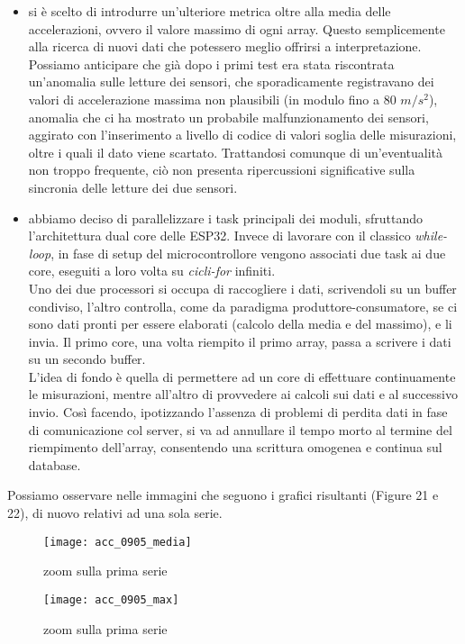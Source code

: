 \documentclass[fleqn,10pt]{SelfArx} %
\begin{document}
\begin{itemize}[noitemsep] %
	\item si è scelto di introdurre un'ulteriore metrica oltre alla media delle accelerazioni, ovvero il valore massimo di 
	ogni array. Questo semplicemente alla ricerca di nuovi dati che potessero meglio offrirsi a interpretazione.\\
	Possiamo anticipare che già dopo i primi test era stata riscontrata un'anomalia sulle letture dei sensori, che sporadicamente 
	registravano dei valori di accelerazione massima non plausibili (in modulo fino a 80 $ m/s^2 $), anomalia che ci ha mostrato 
	un probabile malfunzionamento dei sensori, aggirato con l'inserimento a livello di codice di valori soglia delle misurazioni, 
	oltre i quali il dato viene scartato. Trattandosi comunque di un'eventualità non troppo frequente, ciò non presenta 
	ripercussioni significative sulla sincronia delle letture dei due sensori.
	\item abbiamo deciso di parallelizzare i task principali dei moduli, sfruttando l'architettura dual core delle ESP32. 
	Invece di lavorare con il classico \textit{while-loop}, in fase di setup del microcontrollore vengono associati due task ai due 
	core, eseguiti a loro volta su \textit{cicli-for} infiniti. \\
	Uno dei due processori si occupa di raccogliere i dati, scrivendoli su un buffer 
	condiviso, l'altro controlla, come da paradigma produttore-consumatore, se ci sono dati pronti per essere elaborati (calcolo 
	della media e del massimo), e li invia. Il primo core, una volta riempito il primo array, passa a scrivere i dati su un 
	secondo buffer.\\
	L'idea di fondo è quella di permettere ad un core di effettuare continuamente le misurazioni, mentre all'altro di provvedere 
	ai calcoli sui dati e al successivo invio. Così facendo, ipotizzando l'assenza di problemi di perdita dati in fase di 
	comunicazione col server, si va ad annullare il tempo morto al termine del riempimento dell'array,
	consentendo una scrittura omogenea e continua sul database.
\end{itemize}

Possiamo osservare nelle immagini che seguono i grafici risultanti (Figure 21 e 22), di nuovo relativi ad una sola serie. 

\begin{figure}[htb]\centering
	\texttt{[image: acc\_0905\_media]}
	\caption{zoom sulla prima serie}
	\label{fig:zoom accelerazione 2104}
\end{figure}
\begin{figure}[htb]\centering
	\texttt{[image: acc\_0905\_max]}
	\caption{zoom sulla prima serie}
	\label{fig:zoom accelerazione 2104}
\end{figure}
\end{document}
